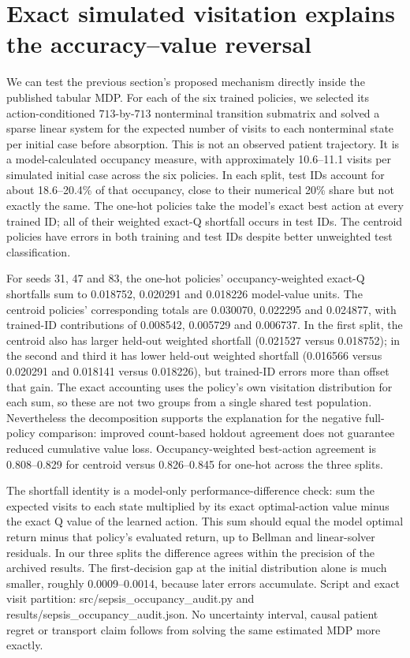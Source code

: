\section{Exact simulated visitation explains the accuracy--value reversal}
We can test the previous section's proposed mechanism directly inside the published tabular MDP. For each of the six trained policies, we selected its action-conditioned $713$-by-$713$ nonterminal transition submatrix and solved a sparse linear system for the expected number of visits to each nonterminal state per initial case before absorption. This is not an observed patient trajectory. It is a model-calculated occupancy measure, with approximately 10.6--11.1 visits per simulated initial case across the six policies. In each split, test IDs account for about 18.6--20.4\% of that occupancy, close to their numerical 20\% share but not exactly the same. The one-hot policies take the model's exact best action at every trained ID; all of their weighted exact-Q shortfall occurs in test IDs. The centroid policies have errors in both training and test IDs despite better unweighted test classification.

For seeds 31, 47 and 83, the one-hot policies' occupancy-weighted exact-Q shortfalls sum to 0.018752, 0.020291 and 0.018226 model-value units. The centroid policies' corresponding totals are 0.030070, 0.022295 and 0.024877, with trained-ID contributions of 0.008542, 0.005729 and 0.006737. In the first split, the centroid also has larger held-out weighted shortfall (0.021527 versus 0.018752); in the second and third it has lower held-out weighted shortfall (0.016566 versus 0.020291 and 0.018141 versus 0.018226), but trained-ID errors more than offset that gain. The exact accounting uses the policy's own visitation distribution for each sum, so these are not two groups from a single shared test population. Nevertheless the decomposition supports the explanation for the negative full-policy comparison: improved count-based holdout agreement does not guarantee reduced cumulative value loss. Occupancy-weighted best-action agreement is 0.808--0.829 for centroid versus 0.826--0.845 for one-hot across the three splits.

The shortfall identity is a model-only performance-difference check: sum the expected visits to each state multiplied by its exact optimal-action value minus the exact Q value of the learned action. This sum should equal the model optimal return minus that policy's evaluated return, up to Bellman and linear-solver residuals. In our three splits the difference agrees within the precision of the archived results. The first-decision gap at the initial distribution alone is much smaller, roughly 0.0009--0.0014, because later errors accumulate. Script and exact visit partition: src/sepsis\_occupancy\_audit.py and results/sepsis\_occupancy\_audit.json. No uncertainty interval, causal patient regret or transport claim follows from solving the same estimated MDP more exactly.

